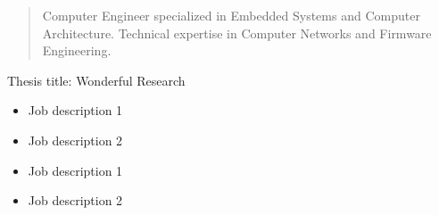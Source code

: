 \documentclass[10pt,a4paper,ragged2e]{altacv}
\begin{document}
\begin{paracol}{2}



\begin{quote}
Computer Engineer specialized in Embedded Systems and Computer
Architecture. Technical expertise in Computer Networks and Firmware
Engineering.
\end{quote}



Thesis title: Wonderful Research

\divider


\divider





\begin{itemize}
\item Job description 1
\item Job description 2
\end{itemize}

\divider

\begin{itemize}
\item Job description 1
\item Job description 2
\end{itemize}



\end{paracol}
\end{document}
